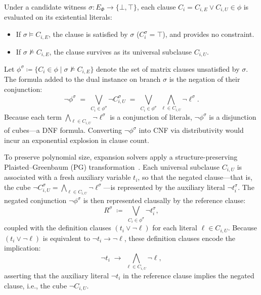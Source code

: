 \documentclass[runningheads]{llncs}
\newcommand{\Bool}{\{\bot,\top\}}
\begin{document}
Under a candidate witness $\sigma : E_\Phi \to \Bool$, each clause $C_i = C_{i,E} \lor C_{i,U} \in \phi$ is evaluated on its existential literals:
\begin{itemize}
    \item If $\sigma \models C_{i,E}$, the clause is satisfied by $\sigma$ ($C_i^\sigma = \top$), and provides no constraint.
    \item If $\sigma \not\models C_{i,E}$, the clause survives as its universal subclause $C_{i,U}$.
\end{itemize}
Let $\phi^\sigma \coloneqq \{C_i \in \phi \mid \sigma \not\models C_{i,E}\}$ denote the set of matrix clauses unsatisfied by $\sigma$.
The formula added to the dual instance on branch $\sigma$ is the negation of their conjunction:
\begin{equation}
    \neg\phi^\sigma \;=\; \bigvee_{C_i \in \phi^\sigma} \neg C_{i,U}^\sigma
    \;=\; \bigvee_{C_i \in \phi^\sigma} \; \bigwedge_{\ell \in C_{i,U}} \neg\ell^\sigma .
    \label{eq:dual-dnf}
\end{equation}
Because each term $\bigwedge_{\ell \in C_{i,U}} \neg\ell^\sigma$ is a conjunction of literals, $\neg\phi^\sigma$ is a disjunction of cubes---a DNF formula.
Converting $\neg\phi^\sigma$ into CNF via distributivity would incur an exponential explosion in clause count.

To preserve polynomial size, expansion solvers apply a structure-preserving Plaisted--Greenbaum (PG) transformation~\cite{plaistedgreenbaum}.
Each universal subclause $C_{i,U}$ is associated with a fresh auxiliary variable $t_i$, so that the negated clause---that is, the cube $\neg C_{i,U}^\sigma = \bigwedge_{\ell \in C_{i,U}} \neg\ell^\sigma$---is represented by the auxiliary literal $\neg t_i^\sigma$.
The negated conjunction $\neg\phi^\sigma$ is then represented clausally by the reference clause:
\begin{equation}
    R^\sigma \;\coloneqq\; \bigvee_{C_i \in \phi^\sigma} \neg t_i^\sigma ,
    \label{eq:reference-clause}
\end{equation}
coupled with the definition clauses $(t_i \lor \neg\ell)$ for each literal $\ell \in C_{i,U}$.
Because $(t_i \lor \neg\ell)$ is equivalent to $\neg t_i \to \neg\ell$, these definition clauses encode the implication:
\begin{equation}
    \neg t_i \;\to\; \bigwedge_{\ell \in C_{i,U}} \neg\ell ,
    \label{eq:pg-implication}
\end{equation}
asserting that the auxiliary literal $\neg t_i$ in the reference clause implies the negated clause, i.e., the cube $\neg C_{i,U}$.
\end{document}
